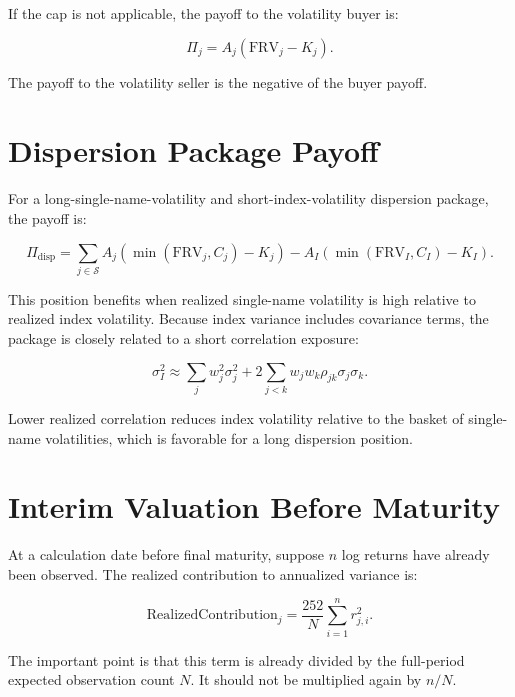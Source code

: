 \documentclass[11pt]{article}
\begin{document}
If the cap is not applicable, the payoff to the volatility buyer is:

\begin{equation}
    \Pi_j
    =
    A_j
    \left(
        \mathrm{FRV}_j - K_j
    \right).
\end{equation}

The payoff to the volatility seller is the negative of the buyer payoff.

\section{Dispersion Package Payoff}

For a long-single-name-volatility and short-index-volatility dispersion package, the payoff is:

\begin{equation}
    \Pi_{\mathrm{disp}}
    =
    \sum_{j \in \mathcal{S}}
    A_j
    \left(
        \min(\mathrm{FRV}_j, C_j) - K_j
    \right)
    -
    A_I
    \left(
        \min(\mathrm{FRV}_I, C_I) - K_I
    \right).
\end{equation}

This position benefits when realized single-name volatility is high relative to realized index volatility. Because index variance includes covariance terms, the package is closely related to a short correlation exposure:

\begin{equation}
    \sigma_I^2
    \approx
    \sum_j w_j^2 \sigma_j^2
    +
    2 \sum_{j<k} w_j w_k \rho_{jk} \sigma_j \sigma_k .
\end{equation}

Lower realized correlation reduces index volatility relative to the basket of single-name volatilities, which is favorable for a long dispersion position.

\section{Interim Valuation Before Maturity}

At a calculation date before final maturity, suppose $n$ log returns have already been observed. The realized contribution to annualized variance is:

\begin{equation}
    \mathrm{RealizedContribution}_j
    =
    \frac{252}{N}
    \sum_{i=1}^{n} r_{j,i}^{2}.
\end{equation}

The important point is that this term is already divided by the full-period expected observation count $N$. It should not be multiplied again by $n/N$.
\end{document}
